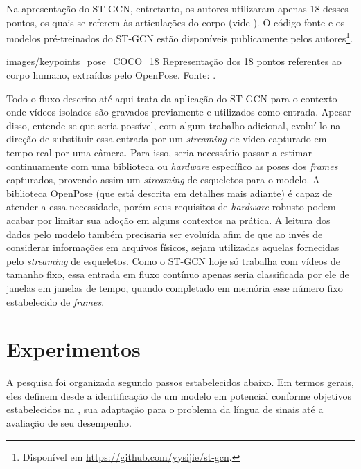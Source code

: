 Na apresentação do ST-GCN, entretanto, os autores utilizaram apenas 18 desses pontos, os quais se referem às articulações do corpo (vide ). O código fonte e os modelos pré-treinados do ST-GCN estão disponíveis publicamente pelos autores\footnote{
    Disponível em \url{https://github.com/yysijie/st-gcn}.
}.

    {images/keypoints_pose_COCO_18}
    {Representação dos 18 pontos referentes ao corpo humano, extraídos pelo OpenPose. Fonte: \cite{openpose-output-2018}.}

Todo o fluxo descrito até aqui trata da aplicação do ST-GCN para o contexto onde vídeos isolados são gravados previamente e utilizados como entrada. Apesar disso, entende-se que seria possível, com algum trabalho adicional, evoluí-lo na direção de substituir essa entrada por um \textit{streaming} de vídeo capturado em tempo real por uma câmera. Para isso, seria necessário passar a estimar continuamente com uma biblioteca ou \textit{hardware} específico as poses dos \textit{frames} capturados, provendo assim um \textit{streaming} de esqueletos para o modelo. A biblioteca OpenPose (que está descrita em detalhes mais adiante) é capaz de atender a essa necessidade, porém seus requisitos de \textit{hardware} robusto podem acabar por limitar sua adoção em alguns contextos na prática. A leitura dos dados pelo modelo também precisaria ser evoluída afim de que ao invés de considerar informações em arquivos físicos, sejam utilizadas aquelas fornecidas pelo \textit{streaming} de esqueletos. Como o ST-GCN hoje só trabalha com vídeos de tamanho fixo, essa entrada em fluxo contínuo apenas seria classificada por ele de janelas em janelas de tempo, quando completado em memória esse número fixo estabelecido de \textit{frames}.


\section{Experimentos} %

A pesquisa foi organizada segundo passos estabelecidos abaixo. Em termos gerais, eles definem desde a identificação de um modelo em potencial conforme objetivos estabelecidos na , sua adaptação para o problema da língua de sinais até a avaliação de seu desempenho.

